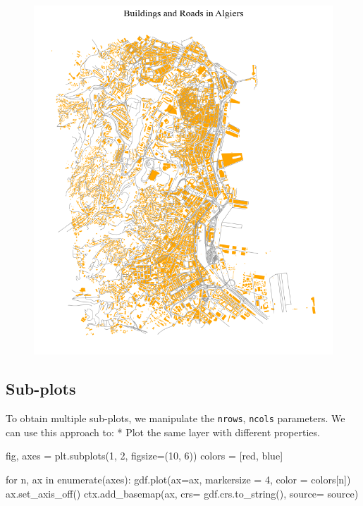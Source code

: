 \documentclass[
  letterpaper,
  DIV=11,
  numbers=noendperiod]{scrreprt}
\newenvironment{Shaded}{\begin{snugshade}}{\end{snugshade}}
\newcommand{\BuiltInTok}[1]{\textcolor[rgb]{0.00,0.23,0.31}{#1}}
\newcommand{\ControlFlowTok}[1]{\textcolor[rgb]{0.00,0.23,0.31}{#1}}
\newcommand{\DecValTok}[1]{\textcolor[rgb]{0.68,0.00,0.00}{#1}}
\newcommand{\KeywordTok}[1]{\textcolor[rgb]{0.00,0.23,0.31}{#1}}
\newcommand{\NormalTok}[1]{\textcolor[rgb]{0.00,0.23,0.31}{#1}}
\newcommand{\OperatorTok}[1]{\textcolor[rgb]{0.37,0.37,0.37}{#1}}
\newcommand{\StringTok}[1]{\textcolor[rgb]{0.13,0.47,0.30}{#1}}
\begin{document}
\begin{figure}[H]

{\centering \includegraphics{labs/w02_maps_files/figure-pdf/cell-19-output-2.png}

}

\end{figure}

\hypertarget{sub-plots}{%
\subsection{Sub-plots}\label{sub-plots}}

To obtain multiple sub-plots, we manipulate the \texttt{nrows},
\texttt{ncols} parameters. We can use this approach to: * Plot the same
layer with different properties.

\begin{Shaded}
\begin{Highlighting}[]
\NormalTok{fig, axes }\OperatorTok{=}\NormalTok{ plt.subplots(}\DecValTok{1}\NormalTok{, }\DecValTok{2}\NormalTok{, figsize}\OperatorTok{=}\NormalTok{(}\DecValTok{10}\NormalTok{, }\DecValTok{6}\NormalTok{))}
\NormalTok{colors }\OperatorTok{=}\NormalTok{ [}\StringTok{\textquotesingle{}red\textquotesingle{}}\NormalTok{, }\StringTok{\textquotesingle{}blue\textquotesingle{}}\NormalTok{]}

\ControlFlowTok{for}\NormalTok{ n, ax }\KeywordTok{in} \BuiltInTok{enumerate}\NormalTok{(axes):}
\NormalTok{    gdf.plot(ax}\OperatorTok{=}\NormalTok{ax, markersize }\OperatorTok{=} \DecValTok{4}\NormalTok{, color }\OperatorTok{=}\NormalTok{ colors[n])}
\NormalTok{    ax.set\_axis\_off()}
\NormalTok{    ctx.add\_basemap(ax, crs}\OperatorTok{=}\NormalTok{ gdf.crs.to\_string(), source}\OperatorTok{=}\NormalTok{ source)}
\end{Highlighting}
\end{Shaded}
\end{document}
